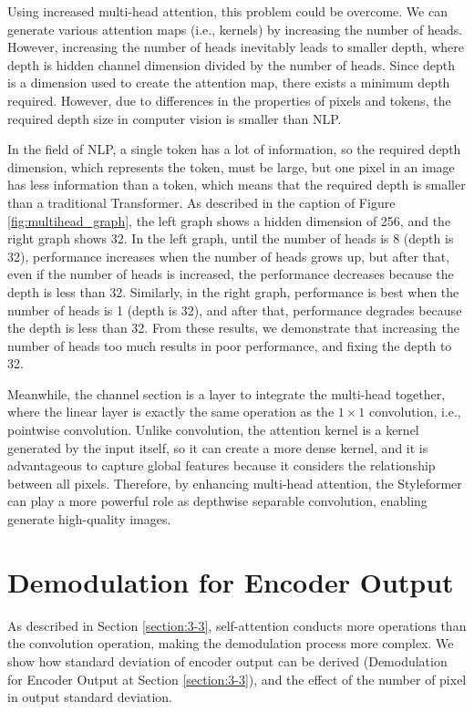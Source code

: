\documentclass[10pt,twocolumn,letterpaper]{article}
\begin{document}
Using increased multi-head attention, this problem could be overcome. We can generate various attention maps (i.e., kernels) by increasing the number of heads. However, increasing the number of heads inevitably leads to smaller depth, where depth is hidden channel dimension divided by the number of heads. Since depth is a dimension used to create the attention map, there exists a minimum depth required. However, due to differences in the properties of pixels and tokens, the required depth size in computer vision is smaller than NLP.

In the field of NLP, a single token has a lot of information, so the required depth dimension, which represents the token, must be large, but one pixel in an image has less information than a token, which means that the required depth is smaller than a traditional Transformer. 
As described in the caption of Figure \ref{fig:multihead_graph}, the left graph shows a hidden dimension of 256, and the right graph shows 32. In the left graph, until the number of heads is 8 (depth is 32), performance increases when the number of heads grows up, but after that, even if the number of heads is increased, the performance decreases because the depth is less than 32. Similarly, in the right graph, performance is best when the number of heads is 1 (depth is 32), and after that, performance degrades because the depth is less than 32.  From these results, we demonstrate that increasing the number of heads too much results in poor performance, and fixing the depth to 32.

Meanwhile, the channel section is a layer to integrate the multi-head together, where the linear layer is exactly the same operation as the $1\times1$ convolution, i.e., pointwise convolution.
Unlike convolution, the attention kernel is a kernel generated by the input itself, so it can create a more dense kernel, and it is advantageous to capture global features because it considers the relationship between all pixels.
Therefore, by enhancing multi-head attention, the Styleformer can play a more powerful role as depthwise separable convolution, enabling generate high-quality images.

\section{Demodulation for Encoder Output}
\label{app:D}
As described in Section \ref{section:3-3}, self-attention conducts more operations than the convolution operation, making the demodulation process more complex. We show how standard deviation of encoder output can be derived (Demodulation for Encoder Output at Section \ref{section:3-3}), and the effect of the number of pixel in output standard deviation.
\end{document}

